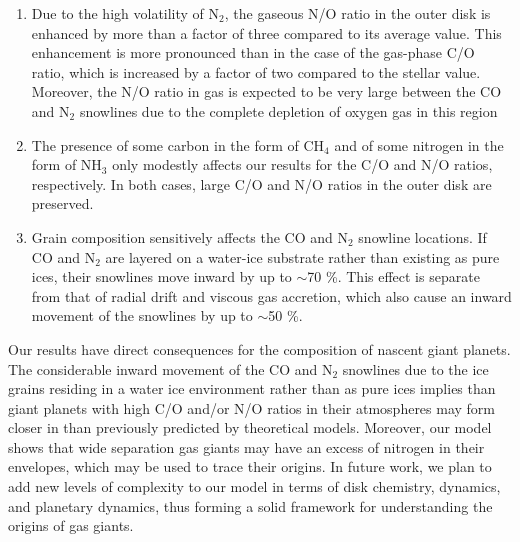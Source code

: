 \documentclass[apj]{emulateapj}
\newcommand{\emgr}[1]{\emph{ \color{gray} #1}}
\begin{document}
\begin{enumerate}

\item Due to the high volatility of N$_2$, the gaseous N/O ratio in the outer disk is enhanced by more than a factor of three compared to its average value. This enhancement is more pronounced than in the case of the gas-phase C/O ratio, which is increased by a factor of two compared to the stellar value. Moreover, the N/O ratio in gas is expected to be very large between the CO and N$_2$ snowlines due to the complete depletion of oxygen gas in this region

\item The presence of some carbon in the form of CH$_4$ and of some nitrogen in the form of NH$_3$ only modestly affects our results for the C/O and N/O ratios, respectively. In both cases, large C/O and N/O ratios in the outer disk are preserved.

\item Grain composition sensitively affects the CO and N$_2$ snowline locations. If CO and N$_2$ are layered on a water-ice substrate rather than existing as pure ices, their snowlines move inward by up to $\sim$70 \%. This effect is separate from that of radial drift and viscous gas accretion, which also cause an inward movement of the snowlines by up to $\sim$50 \%. 

\end{enumerate}

Our results have direct consequences for the composition of nascent giant planets. The considerable inward movement of the CO and N$_2$ snowlines due to the ice grains residing in a water ice environment rather than as pure ices implies than giant planets with high C/O and/or N/O ratios in their atmospheres may form closer in than previously predicted by theoretical models. Moreover, our model shows that wide separation gas giants may have an excess of nitrogen in their envelopes, which may be used to trace their origins. In future work, we plan to add new levels of complexity to our model in terms of disk chemistry, dynamics, and planetary dynamics, thus forming a solid framework for understanding the origins of gas giants. 

\end{document}
